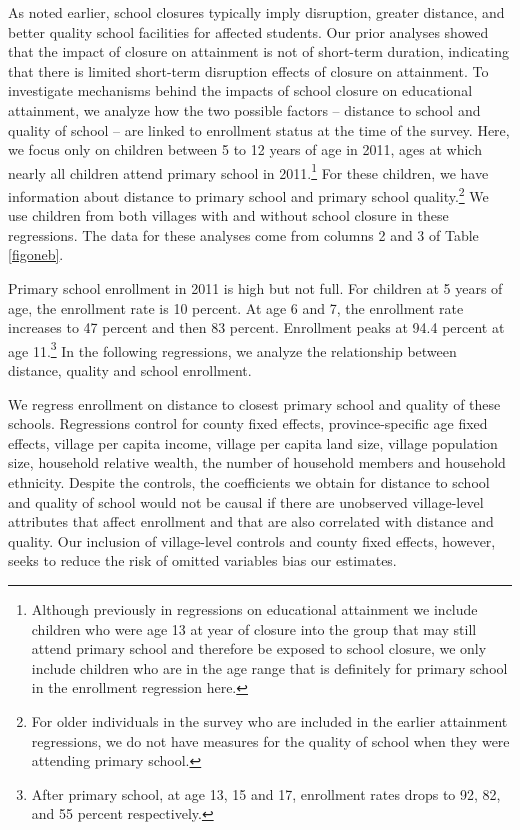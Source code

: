 \documentclass[12pt,english]{article}
\begin{document}
As noted earlier, school closures typically imply disruption, greater distance, and better quality school facilities for affected students. Our prior analyses showed that the impact of closure on attainment is not of short-term duration, indicating that there is limited short-term disruption effects of closure on attainment. To investigate mechanisms behind the impacts of school closure on educational attainment, we analyze how the two possible factors --  distance to school and quality of school -- are linked to enrollment status at the time of the survey. Here, we focus only on children between 5 to 12 years of age in 2011, ages at which nearly all children attend primary school in 2011.\footnote{Although previously in regressions on educational attainment we include children who were age 13 at year of closure into the group that may still attend primary school and therefore be exposed to school closure, we only include children who are in the age range that is definitely for primary school in the enrollment regression here.} For these children, we have information about distance to primary school and primary school quality.\footnote{For older individuals in the survey who are included in the earlier attainment regressions, we do not have measures for the quality of school when they were attending primary school.} We use children from both villages with and without school closure in these regressions. The data for these analyses come from columns 2 and 3 of Table \ref{figoneb}.

Primary school enrollment in 2011 is high but not full. For children at 5 years of age, the enrollment rate is 10 percent. At age 6 and 7, the enrollment rate increases to 47 percent and then 83 percent. Enrollment peaks at 94.4 percent at age 11.\footnote{After primary school, at age 13, 15 and 17, enrollment rates drops to 92, 82, and 55 percent respectively.} In the following regressions, we analyze the relationship between distance, quality and school enrollment.

We regress enrollment on distance to closest primary school and quality of these schools. Regressions control for county fixed effects, province-specific age fixed effects, village per capita income, village per capita land size, village population size, household relative wealth, the number of household members and household ethnicity. Despite the controls, the coefficients we obtain for distance to school and quality of school would not be causal if there are unobserved village-level attributes that affect enrollment and that are also correlated with distance and quality. Our inclusion of village-level controls and county fixed effects, however, seeks to reduce the risk of omitted variables bias our estimates.



\pagebreak
\begingroup
{}
\setlength\bibitemsep{0pt}
\printbibliography
\endgroup
\pagebreak
\end{document}

